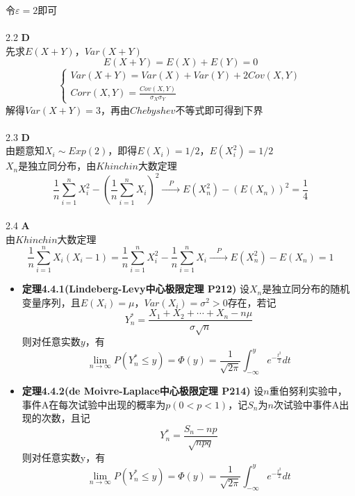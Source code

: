 \documentclass[a4paper]{ctexart}    %
\begin{document}
	令$\varepsilon = 2$即可\\
	\\
	2.2 \quad\textbf{D} \\
	先求$E(X+Y)$，$Var(X+Y)$
	\[E(X+Y) = E(X) + E(Y) = 0\]
	\begin{equation*}
		\begin{cases}
			Var(X+Y)=Var(X)+Var(Y)+2Cov(X,Y)\\
			Corr(X,Y)=\frac{Cov(X,Y)}{\sigma_X \sigma_Y}
		\end{cases}
	\end{equation*}
	解得$Var(X+Y)=3$，再由$Chebyshev$不等式即可得到下界\\
	\\
	2.3 \quad\textbf{D} \\
	由题意知$X_i \sim Exp(2)$，即得$E(X_i)=1/2$，$ E(X_i^2)=1/2 $\\
	${X_n}$是独立同分布，由$Khinchin$大数定理
	\begin{equation*}
		\frac1n\sum\limits_{i=1}^{n}X_i^2-(\frac1n\sum\limits_{i=1}^{n}X_i)^2 \xrightarrow{\quad P\quad} E(X_n^2) - (E(X_n))^2=\frac14
	\end{equation*}
	\\
	2.4 \quad\textbf{A} \\
	由$Khinchin$大数定理
	\begin{equation*}
		\frac1n \sum\limits_{i=1}^{n}X_i(X_i-1)=\frac1n\sum\limits_{i=1}^{n}X_i^2-\frac1n\sum\limits_{i=1}^{n}X_i \xrightarrow{\quad P \quad} E(X_n^2)-E(X_n) = 1
	\end{equation*}
	\begin{tcolorbox}
		[colframe=blue!25,				%
		colback=blue!10,				%
		coltitle=blue!20!black, 		%
		fonttitle=\bfseries,			%
		adjusted title=Formula Or Theorem:	%
		]
		\begin{itemize}
			\item \textbf{定理4.4.1(Lindeberg-Levy中心极限定理 P212)} 设$ X_n $是独立同分布的随机变量序列，且$ E(X_i) = \mu $，$ Var(X_i)=\sigma^2 > 0 $存在，若记
			\begin{equation*}
				Y_n^* = \frac{X_1 + X_2 + \cdots + X_n - n\mu}{\sigma \sqrt{n}}
			\end{equation*}
			则对任意实数$ y $，有
			\begin{equation*}
				\lim\limits_{n \to \infty}P(Y_n^* \leq y) = \varPhi(y) = \frac{1}{\sqrt{2\pi}}\int_{-\infty}^{y}e^{-\frac{t^2}{2}}dt
			\end{equation*}
			\item \textbf{定理4.4.2(de Moivre-Laplace中心极限定理 P214)} 设$ n $重伯努利实验中，事件A在每次试验中出现的概率为$ p (0<p<1) $，记$ S_n $为$ n $次试验中事件A出现的次数，且记
			\begin{equation*}
				Y_n^*=\frac{S_n-np}{\sqrt{npq}}
			\end{equation*}
			则对任意实数y，有
			\begin{equation*}
				\lim\limits_{n \to \infty}P(Y_n^* \leq y) = \varPhi(y) = \frac{1}{\sqrt{2\pi}}\int_{-\infty}^{y}e^{-\frac{t^2}{2}}dt
			\end{equation*}
		\end{itemize}
	\end{tcolorbox}
\end{document}
